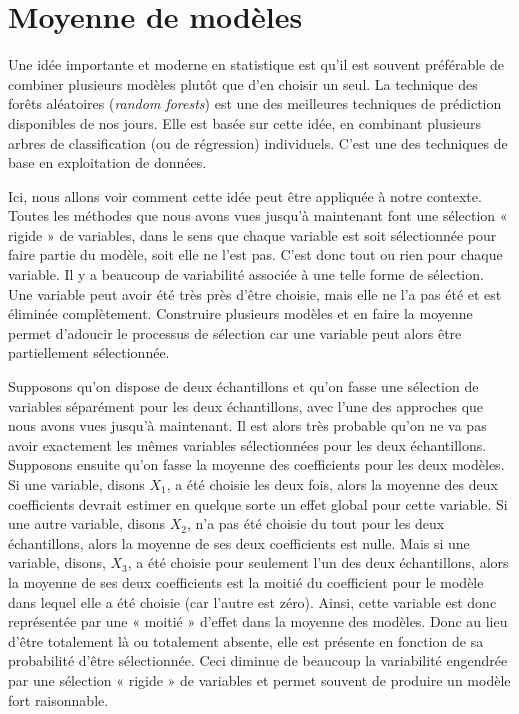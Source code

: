 \documentclass[
  11pt,
  letterpaper,
]{book}
\theoremstyle{definition}
\theoremstyle{definition}
\theoremstyle{definition}
\theoremstyle{remark}
\begin{document}
\hypertarget{moyenne-de-moduxe8les}{%
\section{Moyenne de modèles}\label{moyenne-de-moduxe8les}}

Une idée importante et moderne en statistique est qu'il est souvent préférable de combiner plusieurs modèles plutôt que d'en choisir un seul. La technique des forêts aléatoires (\emph{random forests}) est une des meilleures techniques de prédiction disponibles de nos jours. Elle est basée sur cette idée, en combinant plusieurs arbres de classification (ou de régression) individuels. C'est une des techniques de base en exploitation de données.

Ici, nous allons voir comment cette idée peut être appliquée à notre contexte. Toutes les méthodes que nous avons vues jusqu'à maintenant font une sélection « rigide » de variables, dans le sens que chaque variable est soit sélectionnée pour faire partie du modèle, soit elle ne l'est pas. C'est donc tout ou rien pour chaque variable. Il y a beaucoup de variabilité associée à une telle forme de sélection. Une variable peut avoir été très près d'être choisie, mais elle ne l'a pas été et est éliminée complètement. Construire plusieurs modèles et en faire la moyenne permet d'adoucir le processus de sélection car une variable peut alors être partiellement sélectionnée.

Supposons qu'on dispose de deux échantillons et qu'on fasse une sélection de variables séparément pour les deux échantillons, avec l'une des approches que nous avons vues jusqu'à maintenant. Il est alors très probable qu'on ne va pas avoir exactement les mêmes variables sélectionnées pour les deux échantillons. Supposons ensuite qu'on fasse la moyenne des coefficients pour les deux modèles. Si une variable, disons \(X_1\), a été choisie les deux fois, alors la moyenne des deux coefficients devrait estimer en quelque sorte un effet global pour cette variable. Si une autre variable, disons \(X_2\), n'a pas été choisie du tout pour les deux échantillons, alors la moyenne de ses deux coefficients est nulle. Mais si une variable, disons, \(X_3\), a été choisie pour seulement l'un des deux échantillons, alors la moyenne de ses deux coefficients est la moitié du coefficient pour le modèle dans lequel elle a été choisie (car l'autre est zéro). Ainsi, cette variable est donc représentée par une « moitié » d'effet dans la moyenne des modèles. Donc au lieu d'être totalement là ou totalement absente, elle est présente en fonction de sa probabilité d'être sélectionnée. Ceci diminue de beaucoup la variabilité engendrée par une sélection « rigide » de variables et permet souvent de produire un modèle fort raisonnable.
\end{document}
